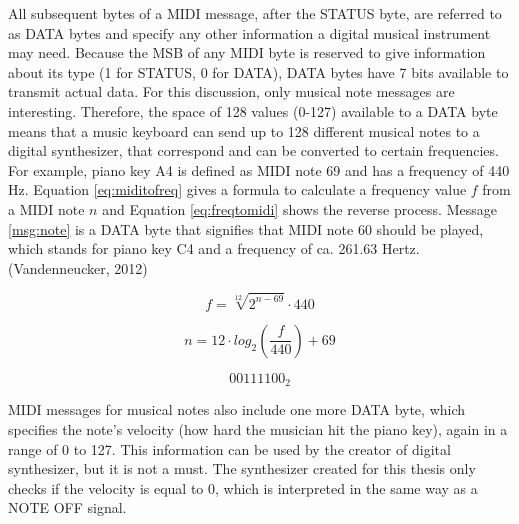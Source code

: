 

\pagebreak

\noindent All subsequent bytes of a MIDI message, after the STATUS byte, are referred to as DATA bytes and specify any other information a digital musical instrument may need. Because the MSB of any MIDI byte is reserved to give information about its type (1 for STATUS, 0 for DATA), DATA bytes have 7 bits available to transmit actual data. For this discussion, only musical note messages are interesting. Therefore, the space of 128 values (0-127) available to a DATA byte means that a music keyboard can send up to 128 different musical notes to a digital synthesizer, that correspond and can be converted to certain frequencies. For example, piano key A4 is defined as MIDI note 69 and has a frequency of 440 Hz. Equation \ref{eq:miditofreq} gives a formula to calculate a frequency value $f$ from a MIDI note $n$ and Equation \ref{eq:freqtomidi} shows the reverse process. Message \ref{msg:note} is a DATA byte that signifies that MIDI note 60 should be played, which stands for piano key C4 and a frequency of ca. 261.63 Hertz. (Vandenneucker, 2012)

\begin{equation}
  f = \sqrt[12]{2^{n-69}} \cdot 440
  \label{eq:miditofreq}
\end{equation}

\begin{equation}
  n = 12 \cdot log_{2}(\frac{f}{440}) + 69
  \label{eq:freqtomidi}
\end{equation}

\begin{equation}
  {00111100}_{2}
  \label{msg:note}
\end{equation}

\noindent MIDI messages for musical notes also include one more DATA byte, which specifies the note's velocity (how hard the musician hit the piano key), again in a range of 0 to 127. This information can be used by the creator of digital synthesizer, but it is not a must. The synthesizer created for this thesis only checks if the velocity is equal to 0, which is interpreted in the same way as a NOTE OFF signal.

